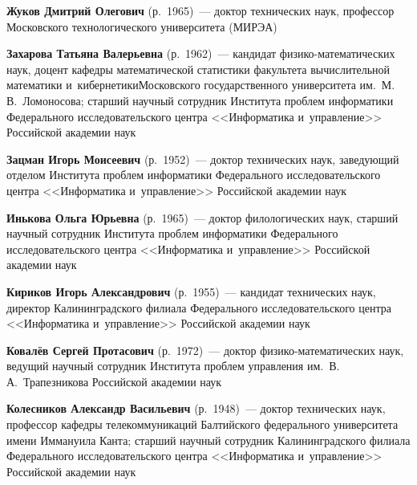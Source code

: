 \begin{multicols}{2}
\vspace*{3pt} 

\noindent
\textbf{Жуков Дмитрий Олегович} (р.\ 1965)~---
доктор технических наук, профессор Московского технологического университета (МИРЭА)

\vspace*{3pt} 

\noindent
\textbf{Захарова Татьяна Валерьевна} (р.\ 1962)~---
кандидат фи\-зи\-ко-ма\-те\-ма\-ти\-че\-ских наук, доцент кафедры 
математической статистики факультета вы\-числительной математики 
и~кибернетики\linebreak Мос\-ков\-ско\-го государственного университета им.\ М.\,В.~Ломоносова; 
старший научный сотрудник Института \mbox{проб\-лем} информатики Федерального 
исследовательского центра <<Информатика и~управ\-ле\-ние>> Российской академии наук 

\vspace*{3pt} 

\noindent
\textbf{Зацман Игорь Моисеевич} (р.\ 1952)~---
доктор тех\-нических наук, заведующий отделом Института проб\-лем информатики 
Федерального исследовательского центра <<Информатика и~управ\-ле\-ние>>
 Российской академии наук 

\columnbreak

\noindent
\textbf{Инькова Ольга Юрьевна} (р.\ 1965)~---
доктор филологических наук, старший научный сотрудник Института проб\-лем 
информатики Федерального исследовательского центра <<Информатика и~управ\-ле\-ние>> 
Российской академии наук 

\vspace*{1pt} 

\noindent
\textbf{Кириков Игорь Александрович} (р.\ 1955)~---
кандидат технических наук, директор Калининградского филиала Федерального 
исследовательского центра <<Информатика и~управ\-ле\-ние>> Российской академии наук

\vspace*{1pt} 

\noindent
\textbf{Ковалёв Сергей Протасович} (р.\ 1972)~---
доктор фи\-зи\-ко-ма\-те\-ма\-ти\-че\-ских наук, ведущий научный сотрудник 
Института проб\-лем управ\-ле\-ния им.\ В.\,А.~Трапезникова Российской академии наук

\vspace*{1pt} 

\noindent
\textbf{Колесников Александр Васильевич} (р.\ 1948)~---
доктор технических наук, профессор кафедры телекоммуникаций Балтийского федерального 
университета имени Иммануила Канта; 
старший научный сотрудник Калининградского филиала Федерального исследовательского 
центра <<Информатика и~управ\-ле\-ние>> Российской академии наук


\end{multicols}
